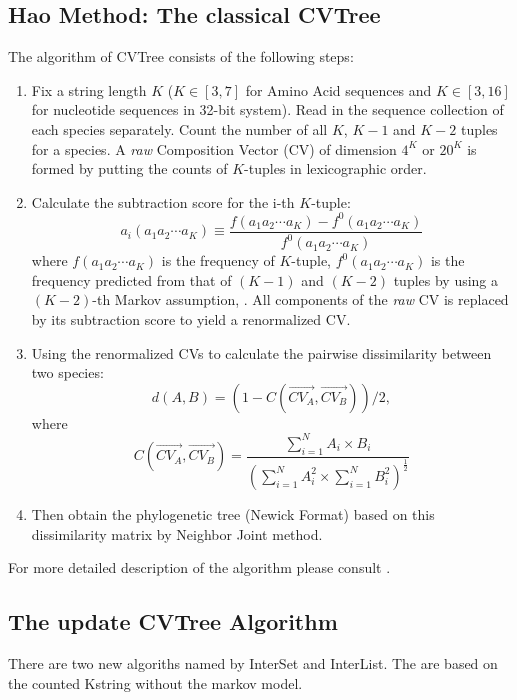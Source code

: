 \documentclass[a4paper,12pt]{article}
\begin{document}
\subsection{Hao Method: The classical CVTree}
The algorithm of CVTree consists of the following steps:
\begin{enumerate}\itemsep 0pt
\item Fix a string length $K$ ($K\in [3,7]$ for Amino Acid sequences and
  $K\in [3,16]$ for nucleotide sequences in 32-bit system). Read in the
  sequence collection of each species separately. Count the number of
  all $K$, $K-1$ and $K-2$ tuples for a species. A {\it raw} Composition
  Vector (CV) of dimension $4^K$ or ${20}^K$ is formed by putting the
  counts of $K$-tuples in lexicographic order.
  \item Calculate the subtraction score for the i-th $K$-tuple:
\begin{equation*}
  a_i(a_1a_2 \cdots a_K) \equiv \frac{f(a_1a_2 \cdots a_K) -
    f^0(a_1a_2 \cdots a_K)}{f^0(a_1a_2 \cdots a_K)}
\end{equation*}
where $f(a_1a_2 \cdots a_K)$ is the frequency of $K$-tuple, $f^0(a_1a_2
\cdots a_K)$ is the frequency predicted from that of $(K-1)$ and $(K-2)$
tuples by using a $(K-2)$-th Markov assumption, \cite{qwh04}.  All
components of the {\it raw} CV is replaced by its subtraction score to
yield a renormalized CV.
\item Using the renormalized CVs to calculate the pairwise dissimilarity
  between two species:
  $$d(A, B)=(1-C(\vec{CV_A},\vec{CV_B}))/2,$$
where
\begin{equation*}
  C(\vec{CV_A},\vec{CV_B})=\frac{\sum_{i=1}^NA_i \times
    B_i}{(\sum_{i=1}^NA_i^2 \times \sum_{i=1}^NB_i^2)^{\frac{1}{2}}}
\end{equation*}

\item Then obtain the phylogenetic tree (Newick Format) based on this
  dissimilarity matrix by Neighbor Joint method.
\end{enumerate}
For more detailed description of the algorithm please consult
\cite{qwh04}. 

\subsection{The update CVTree Algorithm}
There are two new algoriths named by InterSet and InterList. The are based on the 
counted Kstring without the markov model. 
\end{document}
